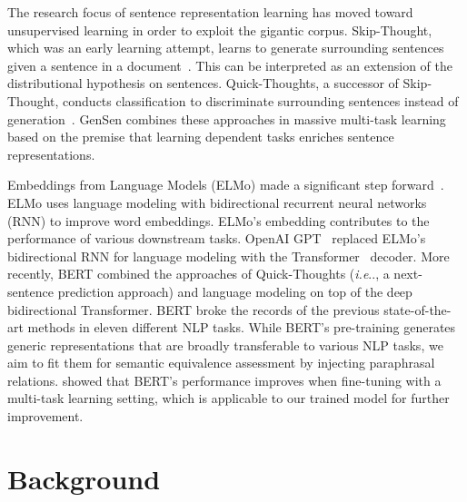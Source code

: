 \documentclass[11pt,a4paper]{article}
\makeatletter
\DeclareRobustCommand\onedot{\futurelet\@let@token\@onedot}
\def\@onedot{\ifx\@let@token.\else.\null\fi\xspace}
\def\ie{\emph{i.e}\onedot} \def\Ie{\emph{I.e}\onedot}
\makeatother
\begin{document}
The research focus of sentence representation learning has moved toward unsupervised learning in order to exploit the gigantic corpus. 
Skip-Thought, which was an early learning attempt, learns to generate surrounding sentences given a sentence in a document~\cite{NIPS2015_5950}.  
This can be interpreted as an extension of the distributional hypothesis on sentences. 
Quick-Thoughts, a successor of Skip-Thought, conducts classification to discriminate surrounding sentences instead of generation~\cite{logeswaran2018an}. 
GenSen combines these approaches in massive multi-task learning~\cite{subramanian2018learning} based on the premise that learning dependent tasks enriches sentence representations. 


Embeddings from Language Models (ELMo) made a significant step forward~\cite{elmo}. 
ELMo uses language modeling with bidirectional recurrent neural networks (RNN) to improve word embeddings. 
ELMo's embedding contributes to the performance of various downstream tasks. 
OpenAI GPT~\cite{opeai-gpt} replaced ELMo's bidirectional RNN for language modeling with the Transformer~\cite{transformer} decoder.  
More recently, BERT combined the approaches of Quick-Thoughts (\ie, a next-sentence prediction approach) and language modeling on top of the deep bidirectional Transformer. 
BERT broke the records of the previous state-of-the-art methods in eleven different NLP tasks. 
While BERT's pre-training generates generic representations that are broadly transferable to various NLP tasks, we aim to fit them for semantic equivalence assessment by injecting paraphrasal relations. 
 showed that BERT's performance improves when fine-tuning with a multi-task learning setting, which is applicable to our trained model for further improvement. 


\section{Background}
\end{document}
